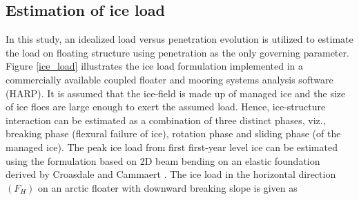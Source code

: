 \documentclass[review]{elsarticle}
\begin{document}
\subsection{Estimation of ice load}



In this study, an idealized load versus penetration evolution is utilized to estimate the load on floating structure using penetration as the only governing parameter. Figure \ref{ice_load} illustrates the ice load formulation implemented in a commercially available coupled floater and mooring systems analysis software (HARP). It is assumed that the ice-field is made up of managed ice and the size of ice floes are large enough to exert the assumed load. Hence, ice-structure interaction can be estimated as a combination of three distinct phases, viz., breaking phase (flexural failure of ice), rotation phase and sliding phase (of the managed ice). The peak ice load from first first-year level ice can be estimated using the formulation based on 2D beam bending on an elastic foundation derived by Croasdale and Cammaert \cite{Croasdale_1994}. The ice load in the horizontal direction $(F_H)$ on an arctic floater with downward breaking slope is given as \cite{Timco_1997}
\end{document}
